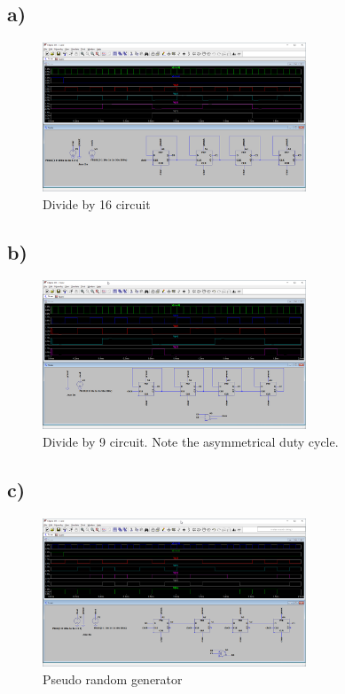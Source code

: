 \documentclass{article}
\begin{document}
	\subsection*{a)}
	
	\begin{figure}[H]
	    \centering
	    \includegraphics[width=0.7\textwidth]{1a}
	    \caption{Divide by 16 circuit}
	\end{figure}
	
	\subsection*{b)}

	\begin{figure}[H]
	    \centering
	    \includegraphics[width=0.7\textwidth]{1b}
	    \caption{Divide by 9 circuit. Note the asymmetrical duty cycle.}
	\end{figure}
		
	\subsection*{c)}
	
	\begin{figure}[H]
	    \centering
	    \includegraphics[width=0.7\textwidth]{1c}
	    \caption{Pseudo random generator}
	\end{figure}
	
\end{document}
